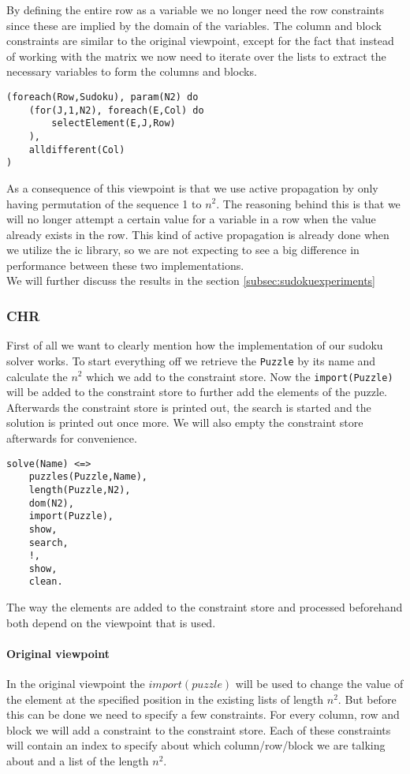 By defining the entire row as a variable we no longer need the row constraints since these are implied by the domain of the variables.
The column and block constraints are similar to the original viewpoint, except for the fact that instead of working with the matrix we now need to iterate over the lists to extract the necessary variables to form the columns and blocks.

\begin{lstlisting}
(foreach(Row,Sudoku), param(N2) do
	(for(J,1,N2), foreach(E,Col) do
		selectElement(E,J,Row)
	),
	alldifferent(Col)
)
\end{lstlisting}

As a consequence of this viewpoint is that we use active propagation by only having permutation of the sequence 1 to $n^2$.
The reasoning behind this is that we will no longer attempt a certain value for a variable in a row when the value already exists in the row. 
This kind of active propagation is already done when we utilize the ic library, so we are not expecting to see a big difference in performance between these two implementations.\\

We will further discuss the results in the section \ref{subsec:sudokuexperiments}

\subsubsection{CHR}
First of all we want to clearly mention how the implementation of our sudoku solver works.
To start everything off we retrieve the \texttt{Puzzle} by its name and calculate the $n^2$ which we add to the constraint store.
Now the \texttt{import(Puzzle)} will be added to the constraint store to further add the elements of the puzzle.
Afterwards the constraint store is printed out, the search is started and the solution is printed out once more. 
We will also empty the constraint store afterwards for convenience.

\begin{lstlisting}
solve(Name) <=>
	puzzles(Puzzle,Name),
	length(Puzzle,N2),
	dom(N2),
	import(Puzzle),
	show,
	search,
	!,
	show,
	clean.
\end{lstlisting}

The way the elements are added to the constraint store and processed beforehand both depend on the viewpoint that is used.

\paragraph*{Original viewpoint}
In the original viewpoint the \texttt{$import(puzzle)$} will be used to change the value of the element at the specified position in the existing lists of length $n^{2}$. 
But before this can be done we need to specify a few constraints.
For every column, row and block we will add a constraint to the constraint store.
Each of these constraints will contain an index to specify about which column/row/block we are talking about and a list of the length $n^2$.\\

